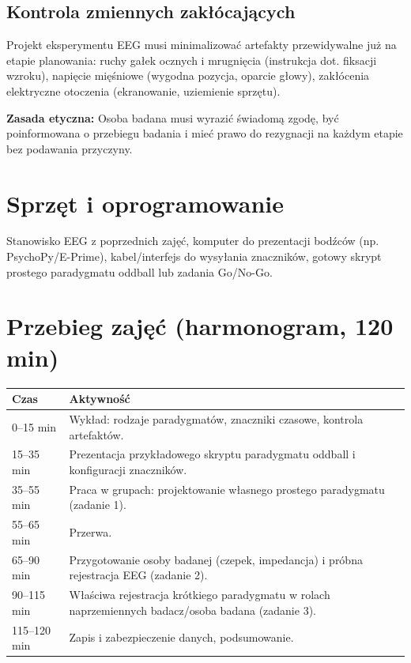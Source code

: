 \documentclass[11pt,a4paper]{article}
\newcommand{\infobox}[1]{%
  \par\noindent\colorbox{lgray}{\parbox{\dimexpr\linewidth-2\fboxsep}{\vspace{2pt}#1\vspace{2pt}}}\par\vspace{4pt}}
\begin{document}
\subsection{Kontrola zmiennych zakłócających}
Projekt eksperymentu EEG musi minimalizować artefakty przewidywalne już na etapie planowania: ruchy gałek ocznych i mrugnięcia (instrukcja dot. fiksacji wzroku), napięcie mięśniowe (wygodna pozycja, oparcie głowy), zakłócenia elektryczne otoczenia (ekranowanie, uziemienie sprzętu).

\infobox{\textbf{Zasada etyczna:} Osoba badana musi wyrazić świadomą zgodę, być poinformowana o przebiegu badania i mieć prawo do rezygnacji na każdym etapie bez podawania przyczyny.}

\section{Sprzęt i oprogramowanie}
Stanowisko EEG z poprzednich zajęć, komputer do prezentacji bodźców (np. PsychoPy/E-Prime), kabel/interfejs do wysyłania znaczników, gotowy skrypt prostego paradygmatu oddball lub zadania Go/No-Go.

\section{Przebieg zajęć (harmonogram, 120 min)}
\begin{center}
\begin{tabular}{@{}p{2.3cm}p{11.7cm}@{}}
\toprule
\textbf{Czas} & \textbf{Aktywność}\\
\midrule
0--15 min & Wykład: rodzaje paradygmatów, znaczniki czasowe, kontrola artefaktów.\\
15--35 min & Prezentacja przykładowego skryptu paradygmatu oddball i konfiguracji znaczników.\\
35--55 min & Praca w grupach: projektowanie własnego prostego paradygmatu (zadanie 1).\\
55--65 min & Przerwa.\\
65--90 min & Przygotowanie osoby badanej (czepek, impedancja) i próbna rejestracja EEG (zadanie 2).\\
90--115 min & Właściwa rejestracja krótkiego paradygmatu w rolach naprzemiennych badacz/osoba badana (zadanie 3).\\
115--120 min & Zapis i zabezpieczenie danych, podsumowanie.\\
\bottomrule
\end{tabular}
\end{center}
\end{document}
